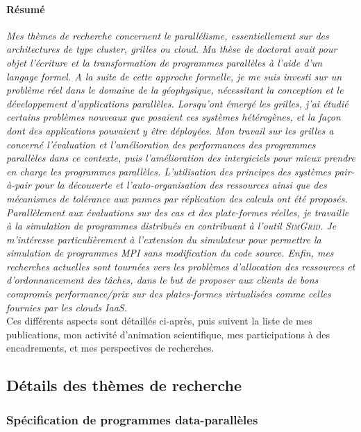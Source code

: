 \documentclass[11pt]{article}
\begin{document}
\paragraph{Résumé}
\textit{Mes thèmes de recherche concernent le \emph{parallélisme}, 
essentiellement sur des architectures de type cluster, \emph{grilles} ou 
\emph{cloud}. Ma thèse de doctorat avait pour objet l'écriture et la 
transformation de programmes parallèles à l'aide d'un langage formel. A la 
suite de cette approche formelle, je me suis investi sur un problème réel dans 
le domaine de la  géophysique, nécessitant la conception et le développement 
d'applications parallèles. Lorsqu'ont émergé les grilles, j'ai étudié certains 
problèmes nouveaux que posaient ces systèmes hétérogènes, et la façon dont des 
applications pouvaient y être déployées. Mon travail sur les grilles a concerné 
l'évaluation et l'amélioration des performances des programmes parallèles dans 
ce contexte, puis l'amélioration des intergiciels pour mieux prendre en charge 
les programmes parallèles. L'utilisation des principes des systèmes pair-à-pair 
pour la découverte et l'auto-organisation des ressources ainsi que des 
mécanismes de tolérance aux pannes par réplication des calculs ont été proposés.
Parallèlement aux évaluations sur des cas et des plate-formes réelles, je 
travaille à la simulation de programmes distribués en contribuant à l'outil 
\textsc{SimGrid}. Je m'intéresse particulièrement à l'extension du simulateur 
pour permettre la simulation de programmes MPI sans modification du code source.
Enfin, mes recherches actuelles sont tournées vers les problèmes d'allocation 
des ressources et d'ordonnancement des tâches, dans le but de proposer aux 
clients de bons compromis performance/prix sur des plates-formes virtualisées 
comme celles fournies par les clouds IaaS.}\\ 

Ces différents aspects sont détaillés ci-après, puis suivent la liste de mes 
publications, mon activité d'animation scientifique, mes participations à des 
encadrements, et mes perspectives de recherches.

\subsection{Détails des thèmes de recherche}


\subsubsection{Spécification de programmes data-parallèles}
\end{document}
